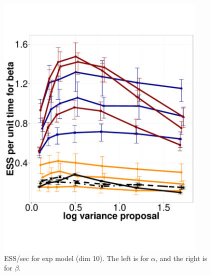 \begin{figure}
\begin{minipage}[hp]{0.45\linewidth}
    \includegraphics [width=0.90\textwidth, angle=0]{figs/exp_10_beta.pdf}
    \vspace{-0 in}
  \end{minipage}
    \caption{ESS/sec for exp model (dim 10). The left is for $\alpha$, and the right is for $\beta$.}
     \label{fig:ESS_EXP_D10}
  \end{figure}
  
